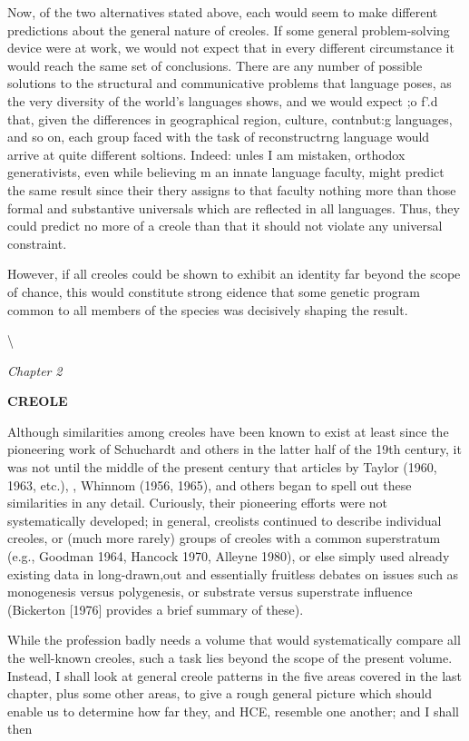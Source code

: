 Now, of the two alternatives stated above, each would seem to make different predictions about the general nature of creoles. If some general problem-solving device were at work, we would not expect that in every different circumstance it would reach the same set of conclusions. There are any number of possible solutions to the struc\-tural and communicative problems that language poses, as the very diversity of the world's languages shows, and we would expect ;o f'.{\textquotedbl}d that, given the differences in geographical region, culture, contnbut:{\textquotedbl}g languages, and so on, each group faced with the task of reconstructrng language would arrive at quite different soltions. Indeed: unles I am mistaken, orthodox generativists, even while believing m an innate language faculty, might predict the same result since their thery assigns to that faculty nothing more than those formal and substantive universals which are reflected in all languages. Thus, they could pre\-dict no more of a creole than that it should not violate any universal constraint.

However, if all creoles could be shown to exhibit an identity far beyond the scope of chance, this would constitute strong eidence that some genetic program common to all members of the species was decisively shaping the result.

{\textbackslash}

\textit{Chapter} \textit{2}

\bfseries
CREOLE

Although similarities among creoles have been known to exist at least since the pioneering work of Schuchardt and others in the latter half of the 19th century, it was not until the middle of the present century that articles by Taylor (1960, 1963, etc.), \citet{Thompson1961}, Whinnom (1956, 1965), and others began to spell out these similarities in any detail. Curiously, their pioneering efforts were not systematically developed; in general, creolists continued to describe individual creoles, or (much more rarely) groups of creoles with a common superstratum (e.g., Goodman 1964, Hancock 1970, Alleyne 1980), or else simply used already existing data in long-drawn,out and essentially fruitless debates on issues such as monogenesis versus poly\-genesis, or substrate versus superstrate influence (Bickerton [1976] provides a brief summary of these).

While the profession badly needs a volume that would systema\-tically compare all the well-known creoles, such a task lies beyond the scope of the present volume. Instead, I shall look at general creole patterns in the five areas covered in the last chapter, plus some other areas, to give a rough general picture which should enable us to deter\-mine how far they, and HCE, resemble one another; and I shall then

